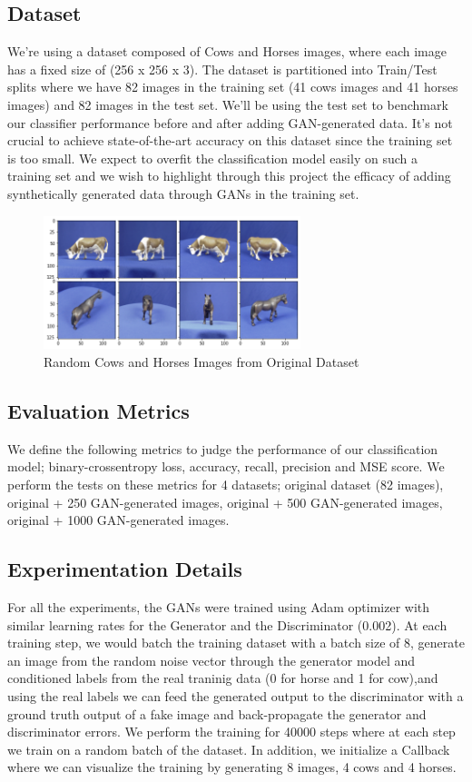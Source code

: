 \documentclass[conference]{IEEEtran}
\begin{document}
\subsection{Dataset}
We're using a dataset composed of Cows and Horses images, where each image has a fixed size of (256 x 256 x 3). The dataset is partitioned into Train/Test splits where we have 82 images in the training set (41 cows images and 41 horses images) and 82 images in the test set. We'll be using the test set to benchmark our classifier performance before and after adding GAN-generated data. It's not crucial to achieve state-of-the-art accuracy on this dataset since the training set is too small. We expect to overfit the classification model easily on such a training set and we wish to highlight through this project the efficacy of adding synthetically generated data through GANs in the training set.
\begin{figure}[htbp]
\centerline{\includegraphics[width=75mm]{1.png}}
\caption{Random Cows and Horses Images from Original Dataset}
\label{fig}
\end{figure}

\subsection{Evaluation Metrics}\label{AA}
We define the following metrics to judge the performance of our classification model; binary-crossentropy loss, accuracy, recall, precision and MSE score. We perform the tests on these metrics for 4 datasets; original dataset (82 images), original + 250 GAN-generated images, original + 500 GAN-generated images, original + 1000 GAN-generated images.

\subsection{Experimentation Details}
For all the experiments, the GANs were trained using Adam optimizer with similar learning rates for the Generator and the Discriminator (0.002). At each training step, we would batch the training dataset with a batch size of 8, generate an image from the random noise vector through the generator model and conditioned labels from the real traninig data (0 for horse and 1 for cow),and using the real labels we can feed the generated output to the discriminator with a ground truth output of a fake image and back-propagate the generator and discriminator errors.
We perform the training for 40000 steps where at each step we train on a random batch of the dataset. In addition, we initialize a Callback where we can visualize the training by generating 8 images, 4 cows and 4 horses.
\end{document}
